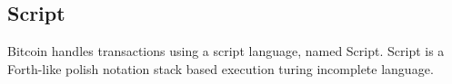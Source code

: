 

\subsection{Script}
Bitcoin handles transactions using a script language, named Script.
Script is a Forth-like polish notation stack based execution turing incomplete
language\cite{}.

